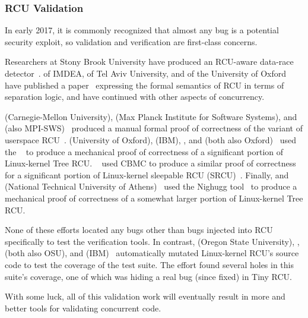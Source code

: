 \subsubsection{RCU Validation}
\label{sec:defer:RCU Validation}

In early 2017, it is commonly recognized that almost any bug is a potential
security exploit, so validation and verification are first-class concerns.

Researchers at Stony Brook University have produced an RCU-aware data-race
detector~\cite{AbhinavDuggal2010Masters,JustinSeyster2012PhD,Seyster:2011:RFA:2075416.2075425}.
 of IMDEA,  of Tel Aviv University,
and  of the University of Oxford have published a
paper~\cite{AlexeyGotsman2012VerifyGraceExtended} expressing the formal
semantics of RCU in terms of separation logic, and have continued with
other aspects of concurrency.

 (Carnegie-Mellon University),  (Max
Planck Institute for Software Systems), and 
(also MPI-SWS)~\cite{JosephTassarotti2015RCUproof}
produced a manual formal proof of correctness of the 
variant of userspace
RCU~\cite{MathieuDesnoyers2009URCU,MathieuDesnoyers2012URCU}.
 (University of Oxford),  (IBM),
, and 
(both also Oxford)~\cite{LihaoLiang2016VerifyTreeRCU}
used the ~\cite{EdmundClarke2004CBMC}
to produce a mechanical proof of correctness of a significant portion
of Linux-kernel Tree RCU\@.
~\cite{LanceRoy2017CBMC-SRCU} used CBMC to produce a similar
proof of correctness for a significant portion of Linux-kernel
sleepable RCU (SRCU)~\cite{PaulEMcKenney2006c}.
Finally,  and 
(National Technical University of
Athens)~\cite{MichalisKokologiannakis2017NidhuggRCU,MichalisKokologiannakis2019RCUstatelessModelCheck}
used the Nighugg tool~\cite{CarlLeonardsson2014Nidhugg}
to produce a mechanical proof of correctness of a somewhat larger
portion of Linux-kernel Tree RCU\@.

None of these efforts located any bugs other than bugs injected into
RCU specifically to test the verification tools.
In contrast,
 (Oregon State University), ,
 (both also OSU), and 
(IBM)~\cite{Groce:2015:VMC:2916135.2916190}
automatically mutated Linux-kernel RCU's source code to test the
coverage of the  test suite.
The effort found several holes in this suite's coverage, one of which
was hiding a real bug (since fixed) in Tiny RCU\@.

With some luck, all of this validation work will eventually result in
more and better tools for validating concurrent code.
